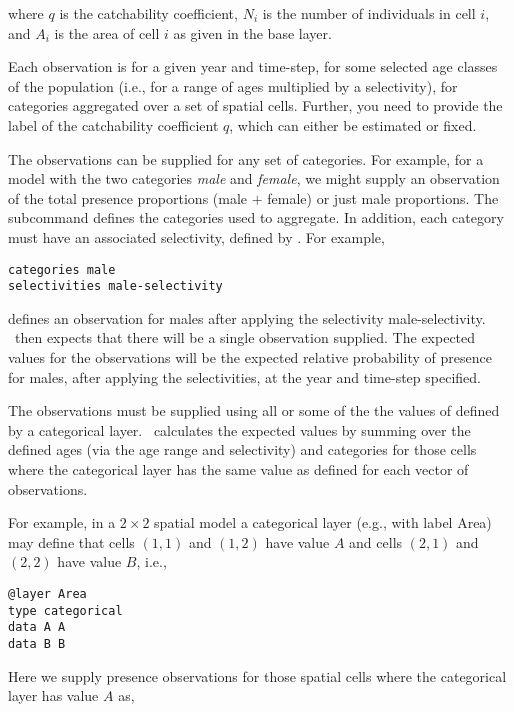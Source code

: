 {{{{{{where $q$ is the catchability coefficient, $N_i$ is the number of individuals in cell $i$, and $A_i$ is the area of cell $i$ as given in the base layer.

Each observation is for a given year and time-step, for some selected age classes of the population (i.e., for a range of ages multiplied by a selectivity), for categories aggregated over a set of spatial cells. Further, you need to provide the label of the catchability coefficient $q$, which can either be estimated or fixed.

The observations can be supplied for any set of categories. For example, for a model with the two categories \emph{male} and \emph{female}, we might supply an observation of the total presence proportions (male $+$ female) or just male proportions. The subcommand  defines the categories used to aggregate. In addition, each category must have an associated selectivity, defined by . For example,  

{\small{\begin{verbatim}
categories male
selectivities male-selectivity
\end{verbatim}}}

defines an observation for males after applying the selectivity male-selectivity. \SPM\ then expects that there will be a single observation supplied. The expected values for the observations will be the expected relative probability of presence for males, after applying the selectivities, at the year and time-step specified. 

The observations must be supplied using all or some of the the values of defined by a categorical layer. \SPM\ calculates the expected values by summing over the defined ages (via the age range and selectivity) and categories for those cells where the categorical layer has the same value as defined for each vector of observations.

For example, in a $2 \times 2$ spatial model a categorical layer (e.g., with label Area) may define that cells $(1,1)$ and $(1,2)$ have value $A$ and cells $(2,1)$ and $(2,2)$ have value $B$, i.e.,

{\small{\begin{verbatim}
@layer Area
type categorical
data A A 
data B B
\end{verbatim}}}

Here we supply presence observations for those spatial cells where the categorical layer has value $A$ as, 

}}}}}}
